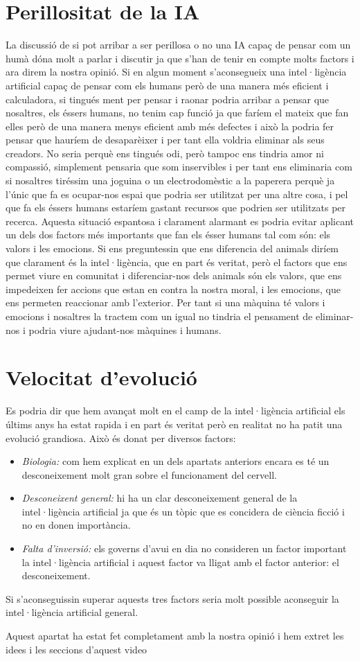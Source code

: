 \section {Perillositat de la IA}
La discussió de si pot arribar a ser perillosa o no una IA capaç de pensar com un humà dóna molt a parlar i discutir ja que s'han de tenir en compte molts factors i ara direm la nostra
opinió.
Si en algun moment s'aconsegueix una intel·ligència artificial capaç de pensar com els humans però de una manera més eficient i calculadora, si tingués ment per pensar i raonar podria arribar
a pensar que nosaltres, els éssers humans, no tenim cap funció ja que faríem el mateix que fan elles però de una manera menys eficient amb més defectes i això la podria fer pensar que hauríem
de desaparèixer i per tant ella voldria eliminar als seus creadors. No seria perquè ens tingués odi, però tampoc ens tindria amor ni compassió, simplement pensaria que som inservibles i per tant
ens eliminaria com si nosaltres tiréssim una joguina o un electrodomèstic a la paperera perquè ja l'únic que fa es ocupar-nos espai que podria ser utilitzat per una altre cosa, i pel que fa
els éssers humans estaríem gastant recursos que podrien ser utilitzats per recerca. Aquesta situació espantosa i clarament alarmant es podria evitar aplicant un dels dos factors més importants
que fan els ésser humans tal com són: els valors i les emocions. Si ens preguntessin que ens diferencia del animals diríem que clarament és la intel·ligència, que en part és veritat, però el
factors que ens permet viure en comunitat i diferenciar-nos dels animals són els valors, que ens impedeixen fer accions que estan en contra la nostra moral, i les emocions, que ens permeten
reaccionar amb l'exterior. Per tant si una màquina té valors i emocions i nosaltres la tractem com un igual no tindria el pensament de eliminar-nos i podria viure ajudant-nos màquines i humans.

\section {Velocitat d'evolució}
Es podria dir que hem avançat molt en el camp de la intel·ligència artificial els últims anys ha estat rapida i en part és veritat però en realitat no ha patit una evolució grandiosa. Això és
donat per diversos factors:
\begin {itemize}
\item \emph{Biologia:} com hem explicat en un dels apartats anteriors encara es té un desconeixement molt gran sobre el funcionament del cervell.
\item \emph{Desconeixent general:} hi ha un clar desconeixement general de la intel·ligència artificial ja que és un tòpic que es concidera de ciència ficció i no en donen importància.
\item \emph{Falta d'inversió:} els governs d'avui en dia no consideren un factor important la intel·ligència artificial i aquest factor va lligat amb el factor anterior: el desconeixement.
\end {itemize}
Si s'aconseguissin superar aquests tres factors seria molt possible aconseguir la intel·ligència artificial general.

Aquest apartat ha estat fet completament amb la nostra opinió i hem extret les idees i les seccions d'aquest video \cite{pbs}
